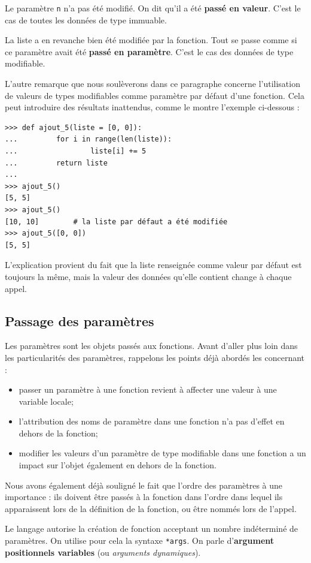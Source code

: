 \documentclass[12pt, a4paper]{article}
\begin{document}
Le paramètre \lstinline{n} n'a pas été modifié. On dit qu'il a été \textbf{passé en valeur}. C'est le cas de toutes les données de type immuable.

La liste a en revanche bien été modifiée par la fonction. Tout se passe comme si ce paramètre avait été \textbf{passé en paramètre}. C'est le cas des données de type modifiable.

L'autre remarque que nous soulèverons dans ce paragraphe concerne l'utilisation de valeurs de types modifiables comme paramètre par défaut d'une fonction. Cela peut introduire des résultats inattendus, comme le montre l'exemple ci-dessous :
\begin{lstlisting}
>>> def ajout_5(liste = [0, 0]):
...			for i in range(len(liste)):
...					liste[i] += 5
... 		return liste
...
>>> ajout_5()
[5, 5]
>>> ajout_5()
[10, 10]		# la liste par défaut a été modifiée
>>> ajout_5([0, 0])
[5, 5]
\end{lstlisting}

L'explication provient du fait que la liste renseignée comme valeur par défaut est toujours la même, mais la valeur des données qu'elle contient change à chaque appel.


\subsection{Passage des paramètres}
Les paramètres sont les objets passés aux fonctions. Avant d'aller plus loin dans les particularités des paramètres, rappelons les points déjà abordés les concernant :
\begin{itemize}
	\item passer un paramètre à une fonction revient à affecter une valeur à une variable locale; 
	\item l'attribution des noms de paramètre dans une fonction n'a pas d'effet en dehors de la fonction;
	\item modifier les valeurs d'un paramètre de type modifiable dans une fonction a un impact sur l'objet également en dehors de la fonction.
\end{itemize}

Nous avons également déjà souligné le fait que l'ordre des paramètres à une importance : ils doivent être passés à la fonction dans l'ordre dans lequel ils apparaissent lors de la définition de la fonction, ou être nommés lors de l'appel.

Le langage autorise la création de fonction acceptant un nombre indéterminé de paramètres. On utilise pour cela la syntaxe \lstinline{*args}. On parle d'\textbf{argument positionnels variables} (ou \textit{arguments dynamiques}).
\end{document}
